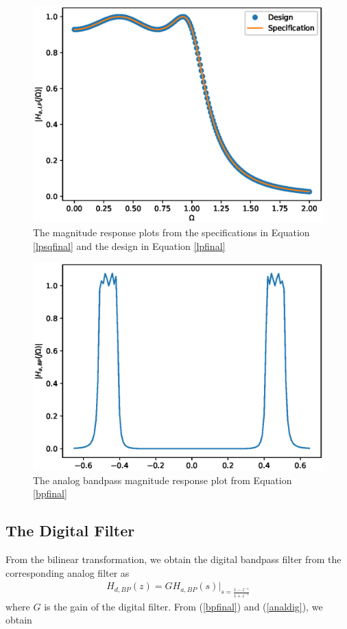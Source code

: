 \documentclass{article}
\begin{document}
\begin{figure}
\label{fig2}
\includegraphics[width = 15cm]{figs/iir/ee18btech11029_LPcheb.eps}
\caption{The magnitude response plots from the specifications in Equation \ref{lpsqfinal} and the design in Equation \ref{lpfinal}}
\end{figure}

\begin{figure}
\label{fig3}
\includegraphics[width = 15cm]{figs/iir/ee18btech11029_analogBP.eps}
\caption{The analog bandpass magnitude response plot from Equation \ref{bpfinal}} 
\end{figure}

\subsection{The Digital Filter}
From the bilinear transformation, we obtain the digital bandpass filter from the corresponding analog filter as
\begin{eqnarray}
\label{analdig}
H_{d,BP}(z) = GH_{a,BP}(s)\vert_{s = \frac{1-z^{-1}}{1 + z^{-1}}}
\end{eqnarray}
where $G$ is the gain of the digital filter.  From (\ref{bpfinal}) and (\ref{analdig}), we obtain
\end{document}
